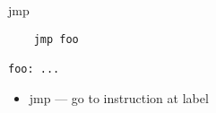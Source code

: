 \begin{frame}[fragile,label=uncondJmp]{jmp}
\begin{lstlisting}
    jmp foo
    
foo: ...
\end{lstlisting}
\begin{itemize}
\item jmp --- go to instruction at label
\end{itemize}
\end{frame}
